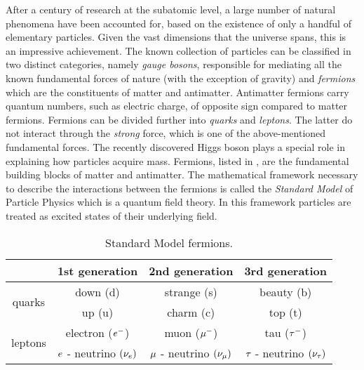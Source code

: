 After a century of research at the subatomic level, a large number of natural phenomena have been accounted
for, based on the existence of only a handful of elementary particles. Given the vast dimensions that the
universe spans, this is an impressive achievement. The known collection of particles can be classified
in two distinct categories, namely {\it gauge bosons}, responsible for mediating all the known fundamental
forces of nature (with the exception of gravity) and {\it fermions} which are the constituents
of matter and antimatter. Antimatter fermions carry quantum numbers, such as electric charge, of opposite
sign compared to matter fermions. Fermions can be divided further into {\it quarks}
and {\it leptons}. The latter do not interact through the {\it strong} force, which is
one of the above-mentioned fundamental forces. The recently discovered Higgs
boson \cite{higgs-cms,higgs-atlas} plays a special role in explaining how particles acquire mass.
Fermions, listed in , are the fundamental building blocks of matter and antimatter.
The mathematical framework necessary to describe the interactions between the fermions is called the
\textit{Standard Model} of Particle Physics \cite{sm-glashow,sm-weinberg,sm-salam} which is a quantum
field theory. In this framework particles are treated as excited states of their underlying field.


\begin{table}[h!]
  \centering
 \begin{tabular}{cccc}
   \hline
                            &  1st generation                     &   2nd generation              &  3rd generation    \\
   \hline
   \multirow{2}{*}{quarks}  &  down (d)                           &   strange (s)                 &  beauty (b)        \\
                            &  up (u)                             &   charm (c)                   &  top (t)           \\
   \hline
   \multirow{2}{*}{leptons} &   electron ($e^-$)                  &   muon ($\mu^-$)               &  tau ($\tau^-$)     \\
                            &   $e$ - neutrino $(\nu_e)$  &  $\mu$ - neutrino $(\nu_\mu)$  &  $\tau$ - neutrino $(\nu_\tau)$  \\
   \hline
 \end{tabular}
 \caption{Standard Model fermions.}
 \label{quarksLeptons}
\end{table}

